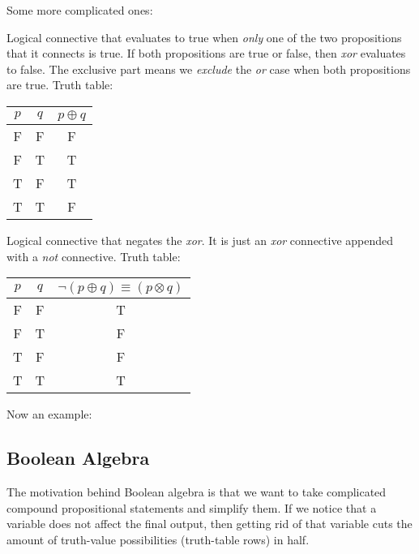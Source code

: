 \documentclass[main.tex]{subfiles}
\begin{document}
Some more complicated ones:

\begin{defn}
	Logical connective that evaluates to true when \textit{only} one of the two propositions that it connects is true. If both propositions are true or false, then \textit{xor} evaluates to false. The exclusive part means we \textit{exclude} the \textit{or} case when both propositions are true. Truth table:
	\begin{center}
		\begin{tabular}{c|c|c}
			\(p\) & \(q\) & \(p \oplus q\) \\
			\hline
			F & F & F \\
			F & T & T \\
			T & F & T \\
			T & T & F
		\end{tabular}
	\end{center}
\end{defn}

\begin{defn}
	Logical connective that negates the \textit{xor}. It is just an \textit{xor} connective appended with a \textit{not} connective. Truth table:
	\begin{center}
		\begin{tabular}{c|c|c}
			\(p\) & \(q\) & \(\lnot (p \oplus q) \equiv (p \otimes q)\) \\
			\hline
			F & F & T \\
			F & T & F \\
			T & F & F \\
			T & T & T
		\end{tabular}
	\end{center}
\end{defn}

Now an example:


\subsection{Boolean Algebra}

The motivation behind Boolean algebra is that we want to take complicated compound propositional statements and simplify them. If we notice that a variable does not affect the final output, then getting rid of that variable cuts the amount of truth-value possibilities (truth-table rows) in half.
\end{document}
